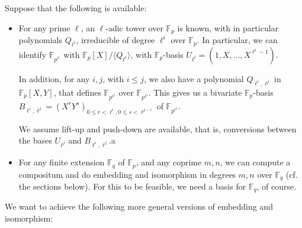\documentclass[12pt]{article}
\def\F {\ensuremath{\mathbb{F}}}
\begin{document}
Suppose that the following is available:
\begin{itemize}
\item For any prime $\ell$, an $\ell$-adic tower over $\F_p$ is known,
  with in particular polynomials $Q_{\ell^i}$, irreducible of degree
  $\ell^i$ over $\F_p$. In particular, we can identify  $\F_{p^{\ell^i}}$
  with $\F_p[X]/\langle Q_{\ell^i} \rangle$, with $\F_p$-basis
  $U_{\ell^i}=(1,X,\dots,X^{\ell^i-1})$. 

  In addition, for any $i,j$, with $i \le j$, we also have a
  polynomial $Q_{\ell^i,\ell^j}$ in $\F_p[X,Y]$, that defines
  $\F_{p^{\ell^j}}$ over $\F_{p^{\ell^j}}$. This gives us a bivariate
  $\F_p$-basis $B_{\ell^i,\ell^j}=(X^r Y^s)_{0 \le r < \ell^i, 0 \le s
    < \ell^{j-i}}$ of $\F_{p^{\ell^j}}$.
  
  We assume lift-up and push-down are available, that is, conversions
  between the bases $U_{\ell^j}$ and $B_{\ell^i,\ell^j}$.a

\item For any finite extension $\F_q$ of $\F_p$, and any coprime
  $m,n$, we can compute a compositum and do embedding and isomorphism
  in degrees $m,n$ over $\F_q$ (cf. the sections below). For this to
  be feasible, we need a basis for $\F_q$, of course.
\end{itemize}
We want to achieve the following more general versions of embedding
and isomorphism:
\end{document}
